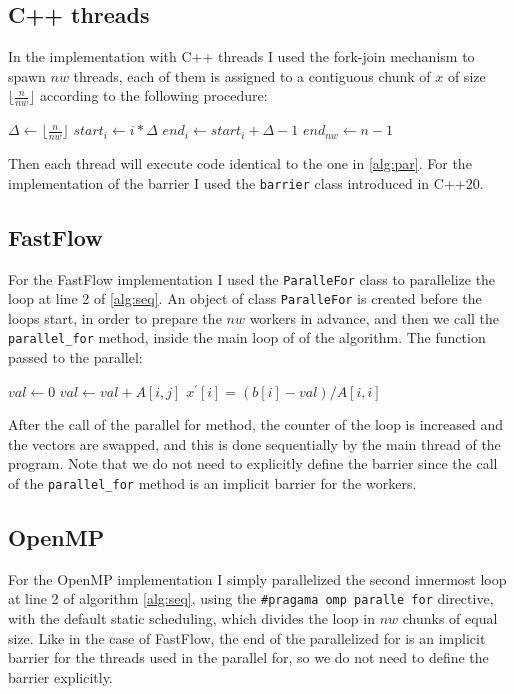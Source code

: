 \documentclass[12pt]{article}
\begin{document}
	\subsection{C++ threads}
	In the implementation with C++ threads I used the fork-join mechanism to spawn $nw$ threads, each of them is assigned to a contiguous chunk of $x$ of size $\lfloor\frac{n}{nw}\rfloor$ according to the following procedure:
	\begin{algorithmic}
		\State $\Delta \gets \lfloor\frac{n}{nw}\rfloor$
			\State $start_i \gets i*\Delta$
			\State $end_i \gets start_i + \Delta - 1$
		\EndFor
		\State $end_{nw} \gets n-1$
	\end{algorithmic}
	Then each thread will execute code identical to the one in \ref{alg:par}. For the implementation of the barrier I used the \verb*|barrier| class introduced in C++20.
	\subsection{FastFlow}
	For the FastFlow implementation I used the \verb|ParalleFor| class to parallelize the loop at line 2 of \ref{alg:seq}. An object of class \verb|ParalleFor| is created before the loops start, in order to prepare the $nw$ workers in advance, and then we call the \verb*|parallel_for| method, inside the main loop of of the algorithm. The function passed to the parallel:
	\begin{algorithmic}
		\Function{parallel\_for\_iteration}{$i$}
		\State $val \gets 0$
		\For{$j \gets 0$ to  $n-1$}
		\If{$i \ne j$}
		\State $val \gets val + A[i,j]$
		\EndIf
		\EndFor
		\State $x^\prime[i] = (b[i]-val)/A[i,i]$
		\EndFunction
	\end{algorithmic}
	After the call of the parallel for method, the counter of the loop is increased and the vectors are swapped, and this is done sequentially by the main thread of the program. Note that we do not need to explicitly define the barrier since the call of the \verb*|parallel_for| method is an implicit barrier for the workers. 
	\subsection{OpenMP}
	For the OpenMP implementation I simply parallelized the second innermost loop at line 2 of algorithm \ref{alg:seq}, using the \verb|#pragama omp paralle for| directive, with the default static scheduling, which divides the loop in $nw$ chunks of equal size. Like in the case of FastFlow, the end of the parallelized for is an implicit barrier for the threads used in the parallel for, so we do not need to define the barrier explicitly.  
\end{document}

